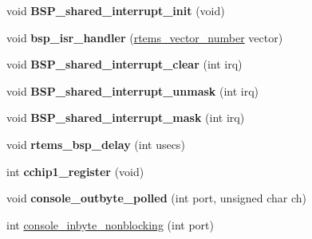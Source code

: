 \begin{DoxyCompactItemize}
void {\bfseries B\+S\+P\+\_\+shared\+\_\+interrupt\+\_\+init} (void)
\item 
\mbox{\label{group__RTEMSBSPsSPARCLEON2_ga6b05ff5e3f13132107c892ff7bfd583d}} 
void {\bfseries bsp\+\_\+isr\+\_\+handler} (\mbox{\hyperlink{group__ClassicINTR_ga3e434c197d99f128e78cae4d9358bd8b}{rtems\+\_\+vector\+\_\+number}} vector)
\item 
\mbox{\label{group__RTEMSBSPsSPARCLEON2_ga700fa96fc6d0ce5340d7b2facc36c15e}} 
void {\bfseries B\+S\+P\+\_\+shared\+\_\+interrupt\+\_\+clear} (int irq)
\item 
\mbox{\label{group__RTEMSBSPsSPARCLEON2_gad8080ffcdab31a4177a4e9b8f55db25b}} 
void {\bfseries B\+S\+P\+\_\+shared\+\_\+interrupt\+\_\+unmask} (int irq)
\item 
\mbox{\label{group__RTEMSBSPsSPARCLEON2_ga5f113e9992f3497076272b5fb473f336}} 
void {\bfseries B\+S\+P\+\_\+shared\+\_\+interrupt\+\_\+mask} (int irq)
\item 
\mbox{\label{group__RTEMSBSPsSPARCLEON2_ga965c5aba9fff0445772a5ec19348cd3c}} 
void {\bfseries rtems\+\_\+bsp\+\_\+delay} (int usecs)
\item 
\mbox{\label{group__RTEMSBSPsSPARCLEON2_ga8cd306c1e91aa9f0789d05993d1aa85a}} 
int {\bfseries cchip1\+\_\+register} (void)
\item 
\mbox{\label{group__RTEMSBSPsSPARCLEON2_ga93eaec294fed78ff6f4b210ceb43707d}} 
void {\bfseries console\+\_\+outbyte\+\_\+polled} (int port, unsigned char ch)
\item 
int \mbox{\hyperlink{group__RTEMSBSPsSPARCLEON2_ga33017a80c39bdce884e201734ceb023d}{console\+\_\+inbyte\+\_\+nonblocking}} (int port)
\end{DoxyCompactItemize}

